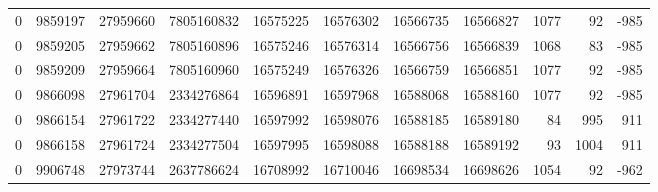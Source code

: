 \begin{tabular}{rrrrrrrrrrr}
0 & 9859197 & 27959660 & 7805160832 & 16575225 & 16576302 & 16566735 & 16566827 & 1077 & 92 & -985 \\
0 & 9859205 & 27959662 & 7805160896 & 16575246 & 16576314 & 16566756 & 16566839 & 1068 & 83 & -985 \\
0 & 9859209 & 27959664 & 7805160960 & 16575249 & 16576326 & 16566759 & 16566851 & 1077 & 92 & -985 \\
0 & 9866098 & 27961704 & 2334276864 & 16596891 & 16597968 & 16588068 & 16588160 & 1077 & 92 & -985 \\
0 & 9866154 & 27961722 & 2334277440 & 16597992 & 16598076 & 16588185 & 16589180 & 84 & 995 & 911 \\
0 & 9866158 & 27961724 & 2334277504 & 16597995 & 16598088 & 16588188 & 16589192 & 93 & 1004 & 911 \\
0 & 9906748 & 27973744 & 2637786624 & 16708992 & 16710046 & 16698534 & 16698626 & 1054 & 92 & -962 \\
\bottomrule
\end{tabular}

